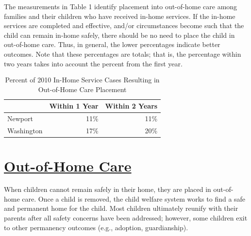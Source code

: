 \documentclass{article}\usepackage[]{graphicx}\usepackage[]{color}
\begin{document}
The measurements in Table 1 identify placement into out-of-home care among families and their children who have received in-home services. If the in-home services are completed and effective, and/or circumstances become such that the child can remain in-home safely, there should be no need to place the child in out-of-home care. Thus, in general, the lower percentages indicate better outcomes. Note that these percentages are totals; that is, the percentage within two years takes into account the percent from the first year.
\vspace{12pt}
\begin{table}[ht]
\centering
\caption{Percent of 2010 In-Home Service Cases Resulting in Out-of-Home Care Placement} 
\begin{tabular}{lrr}
  \toprule
 & Within 1 Year & Within 2 Years \\ 
  \midrule
Newport & 11\% & 11\% \\ 
  Washington & 17\% & 20\% \\ 
   \bottomrule
\end{tabular}
\end{table}



\newpage
\section{\href{http://www.partnersforourchildren.org/child-well-being/visualizations/out-home-care/trends}
    {Out-of-Home Care}
}
When children cannot remain safely in their home, they are placed in out-of-home care. Once a child is removed, the child welfare system works to find a safe and permanent home for the child. Most children ultimately reunify with their parents after all safety concerns have been addressed; however, some children exit to other permanency outcomes (e.g., adoption, guardianship).\\[6pt]

\label{p:ooh}
\end{document}
